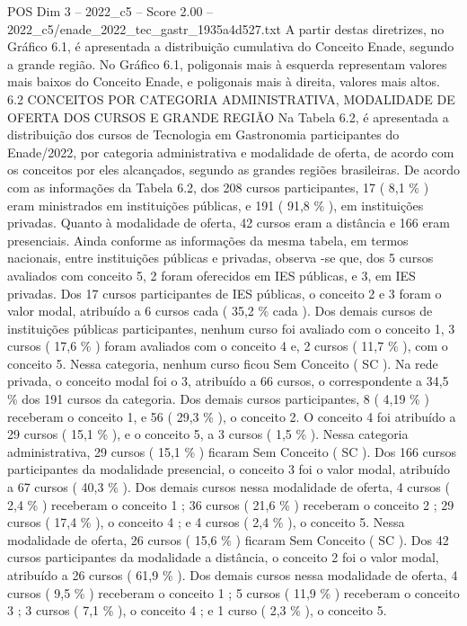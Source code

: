 \begin{textsample}{POS Dim 3 – 2022\_c5 – Score 2.00 – 2022\_c5/enade\_2022\_tec\_gastr\_1935a4d527.txt}
A partir destas diretrizes, no Gráfico 6.1, é apresentada a distribuição cumulativa do Conceito Enade, segundo a grande região.
No Gráfico 6.1, poligonais mais à esquerda representam valores mais baixos do Conceito Enade, e poligonais mais à direita, valores mais altos. 6.2 CONCEITOS POR CATEGORIA ADMINISTRATIVA, MODALIDADE DE OFERTA DOS CURSOS E GRANDE REGIÃO Na Tabela 6.2, é apresentada a distribuição dos cursos de Tecnologia em Gastronomia participantes do Enade/2022, por categoria administrativa e modalidade de oferta, de acordo com os conceitos por eles alcançados, segundo as grandes regiões brasileiras.
De acordo com as informações da Tabela 6.2, dos 208 cursos participantes, 17 ( 8,1 \% ) eram ministrados em instituições públicas, e 191 ( 91,8 \% ), em instituições privadas.
Quanto à modalidade de oferta, 42 cursos eram a distância e 166 eram presenciais.
Ainda conforme as informações da mesma tabela, em termos nacionais, entre instituições públicas e privadas, observa -se que, dos 5 cursos avaliados com conceito 5, 2 foram oferecidos em IES públicas, e 3, em IES privadas.
Dos 17 cursos participantes de IES públicas, o conceito 2 e 3 foram o valor modal, atribuído a 6 cursos cada ( 35,2 \% cada ).
Dos demais cursos de instituições públicas participantes, nenhum curso foi avaliado com o conceito 1, 3 cursos ( 17,6 \% ) foram avaliados com o conceito 4 e, 2 cursos ( 11,7 \% ), com o conceito 5.
Nessa categoria, nenhum curso ficou Sem Conceito ( SC ).
Na rede privada, o conceito modal foi o 3, atribuído a 66 cursos, o correspondente a 34,5 \% dos 191 cursos da categoria.
Dos demais cursos participantes, 8 ( 4,19 \% ) receberam o conceito 1, e 56 ( 29,3 \% ), o conceito 2.
O conceito 4 foi atribuído a 29 cursos ( 15,1 \% ), e o conceito 5, a 3 cursos ( 1,5 \% ).
Nessa categoria administrativa, 29 cursos ( 15,1 \% ) ficaram Sem Conceito ( SC ).
Dos 166 cursos participantes da modalidade presencial, o conceito 3 foi o valor modal, atribuído a 67 cursos ( 40,3 \% ).
Dos demais cursos nessa modalidade de oferta, 4 cursos ( 2,4 \% ) receberam o conceito 1 ; 36 cursos ( 21,6 \% ) receberam o conceito 2 ; 29 cursos ( 17,4 \% ), o conceito 4 ; e 4 cursos ( 2,4 \% ), o conceito 5.
Nessa modalidade de oferta, 26 cursos ( 15,6 \% ) ficaram Sem Conceito ( SC ).
Dos 42 cursos participantes da modalidade a distância, o conceito 2 foi o valor modal, atribuído a 26 cursos ( 61,9 \% ).
Dos demais cursos nessa modalidade de oferta, 4 cursos ( 9,5 \% ) receberam o conceito 1 ; 5 cursos ( 11,9 \% ) receberam o conceito 3 ; 3 cursos ( 7,1 \% ), o conceito 4 ; e 1 curso ( 2,3 \% ), o conceito 5.

\end{textsample}
